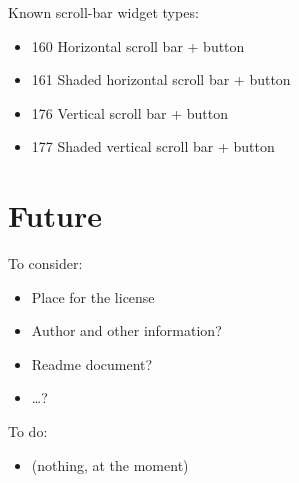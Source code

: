\documentclass{article}
\begin{document}
Known scroll-bar widget types:
\begin{itemize}
\item 160 Horizontal scroll bar + button
\item 161 Shaded horizontal scroll bar + button
\item 176 Vertical scroll bar + button
\item 177 Shaded vertical scroll bar + button
\end{itemize}


\newpage
\section{Future}

To consider:
\begin{itemize}
\item Place for the license
\item Author and other information?
\item Readme document?
\item \ldots?
\end{itemize}

To do:
\begin{itemize}
\item (nothing, at the moment)
\end{itemize}
\end{document}
